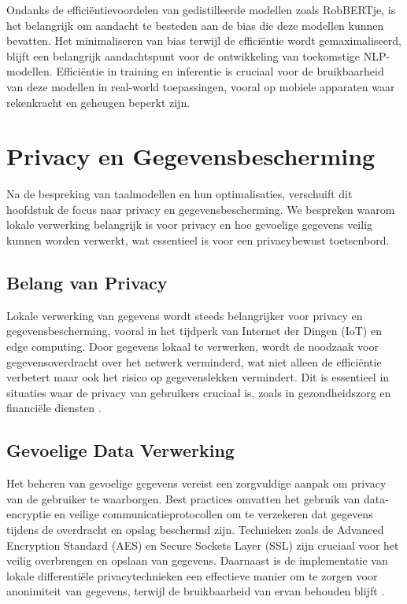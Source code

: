 Ondanks de efficiëntievoordelen van gedistilleerde modellen zoals RobBERTje, is het belangrijk om aandacht te besteden aan de bias die deze modellen kunnen bevatten. Het minimaliseren van bias terwijl de efficiëntie wordt gemaximaliseerd, blijft een belangrijk aandachtspunt voor de ontwikkeling van toekomstige NLP-modellen. Efficiëntie in training en inferentie is cruciaal voor de bruikbaarheid van deze modellen in real-world toepassingen, vooral op mobiele apparaten waar rekenkracht en geheugen beperkt zijn.


\section{Privacy en Gegevensbescherming}

Na de bespreking van taalmodellen en hun optimalisaties, verschuift dit hoofdstuk de focus naar privacy en gegevensbescherming. We bespreken waarom lokale verwerking belangrijk is voor privacy en hoe gevoelige gegevens veilig kunnen worden verwerkt, wat essentieel is voor een privacybewust toetsenbord.

\subsection{Belang van Privacy}

Lokale verwerking van gegevens wordt steeds belangrijker voor privacy en gegevensbescherming, vooral in het tijdperk van Internet der Dingen (IoT) en edge computing. Door gegevens lokaal te verwerken, wordt de noodzaak voor gegevensoverdracht over het netwerk verminderd, wat niet alleen de efficiëntie verbetert maar ook het risico op gegevenslekken vermindert. Dit is essentieel in situaties waar de privacy van gebruikers cruciaal is, zoals in gezondheidszorg en financiële diensten \autocite{Bi2020}.

\subsection{Gevoelige Data Verwerking}

Het beheren van gevoelige gegevens vereist een zorgvuldige aanpak om privacy van de gebruiker te waarborgen. Best practices omvatten het gebruik van data-encryptie en veilige communicatieprotocollen om te verzekeren dat gegevens tijdens de overdracht en opslag beschermd zijn. Technieken zoals de Advanced Encryption Standard (AES) en Secure Sockets Layer (SSL) zijn cruciaal voor het veilig overbrengen en opslaan van gegevens. Daarnaast is de implementatie van lokale differentiële privacytechnieken een effectieve manier om te zorgen voor anonimiteit van gegevens, terwijl de bruikbaarheid van ervan behouden blijft \autocite{Shah2014}.


